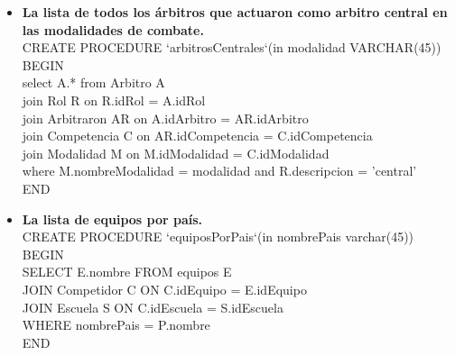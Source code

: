 \begin{itemize}
\item{\textbf{La lista de todos los árbitros que actuaron como arbitro central en las modalidades de combate.}\\
CREATE PROCEDURE `arbitrosCentrales`(in modalidad VARCHAR(45))\\
BEGIN\\
select A.* from Arbitro A\\
	join Rol R on R.idRol = A.idRol\\
	join Arbitraron AR on A.idArbitro = AR.idArbitro\\
    join Competencia C on AR.idCompetencia = C.idCompetencia\\
    join Modalidad M on M.idModalidad = C.idModalidad\\
    where M.nombreModalidad = modalidad and R.descripcion = 'central'\;\\
END\\
}

\item{\textbf{La lista de equipos por país.}\\
CREATE PROCEDURE `equiposPorPais`(in nombrePais varchar(45))\\
BEGIN\\
SELECT E.nombre FROM equipos E\\
	JOIN Competidor C ON C.idEquipo = E.idEquipo\\
	JOIN Escuela S ON C.idEscuela = S.idEscuela\\
	WHERE nombrePais = P.nombre\\
END\\
}
\end{itemize}